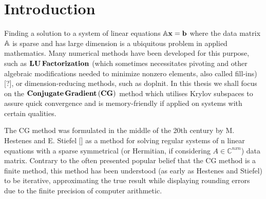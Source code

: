 \chapter*{Introduction}
Finding a solution to a system of linear equations \(\bold{{\mathbb{A}x}=b}\) where the data matrix \(\bold{\mathbb{A}}\) is sparse and has large dimension is a ubiquitous problem in applied mathematics. Many numerical methods have been developed for this purpose, such as \(\bold{LU\,Factorization}\) (which sometimes necessitates pivoting and other algebraic modifications needed to minimize nonzero elements, also called fill-ins) [?], or dimension-reducing methods, such as doplnit. In this thesis we shall focus on the \(\bold{Conjugate\,Gradient\,(CG)}\) method which utilises Krylov subspaces to assure quick convergence and is memory-friendly if applied on systems with certain qualities.


The CG method was formulated in the middle of the 20th century by M. Hestenes and E. Stiefel [\cite{HestenesStiefel52}] as a method for solving regular systems of n linear equations with a sparse symmetrical (or Hermitian, if considering \(A\in{\mathbb{C}^{nxn}}\)) data matrix. Contrary to the often presented popular belief that the CG method is a finite method, this method has been understood (as early as Hestenes and Stiefel) to be iterative, approximating the true result while displaying rounding errors due to the finite precision of computer arithmetic. 


